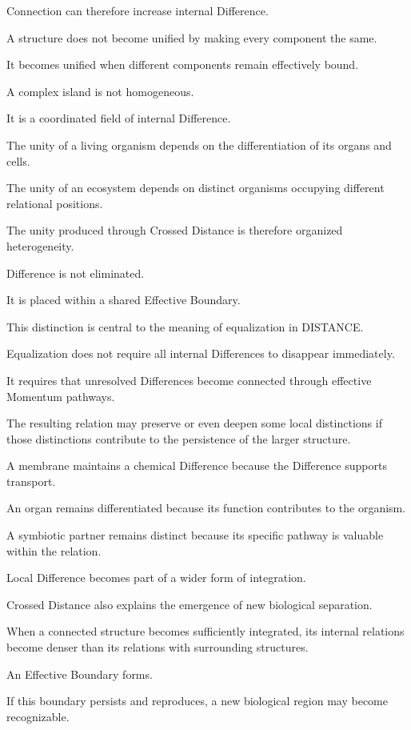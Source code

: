 Connection can therefore increase internal Difference.

A structure does not become unified by making every component the same.

It becomes unified when different components remain effectively bound.

A complex island is not homogeneous.

It is a coordinated field of internal Difference.

The unity of a living organism depends on the differentiation of its organs and cells.

The unity of an ecosystem depends on distinct organisms occupying different relational positions.

The unity produced through Crossed Distance is therefore organized heterogeneity.

Difference is not eliminated.

It is placed within a shared Effective Boundary.

This distinction is central to the meaning of equalization in DISTANCE.

Equalization does not require all internal Differences to disappear immediately.

It requires that unresolved Differences become connected through effective Momentum pathways.

The resulting relation may preserve or even deepen some local distinctions if those distinctions contribute to the persistence of the larger structure.

A membrane maintains a chemical Difference because the Difference supports transport.

An organ remains differentiated because its function contributes to the organism.

A symbiotic partner remains distinct because its specific pathway is valuable within the relation.

Local Difference becomes part of a wider form of integration.

Crossed Distance also explains the emergence of new biological separation.

When a connected structure becomes sufficiently integrated, its internal relations become denser than its relations with surrounding structures.

An Effective Boundary forms.

If this boundary persists and reproduces, a new biological region may become recognizable.

